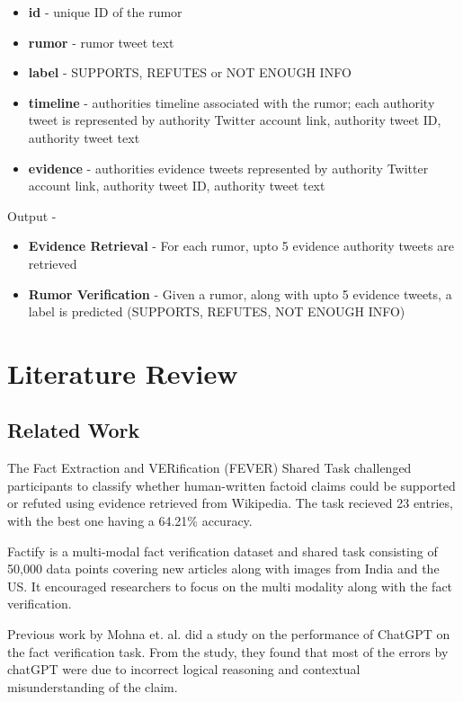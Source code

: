 \documentclass[conference]{IEEEtran}
\begin{document}
\begin{itemize}
    \item \textbf{id} - unique ID of the rumor
    \item \textbf{rumor} - rumor tweet text
    \item \textbf{label} - SUPPORTS, REFUTES or NOT ENOUGH INFO
    \item \textbf{timeline} - authorities timeline associated with the rumor; each authority tweet is represented by authority Twitter account link, authority tweet ID, authority tweet text
    \item \textbf{evidence} - authorities evidence tweets represented by authority Twitter account link, authority tweet ID, authority tweet text  
\end{itemize}
Output -
\begin{itemize}
    \item \textbf{Evidence Retrieval} - For each rumor, upto 5 evidence authority tweets are retrieved
    \item \textbf{Rumor Verification} - Given a rumor, along with upto 5 evidence tweets, a label is predicted (SUPPORTS, REFUTES, NOT ENOUGH INFO) 
    
\end{itemize}

\section{Literature Review}
\subsection{Related Work}
The Fact Extraction and VERification \cite{fever} (FEVER) Shared Task challenged participants to classify whether human-written factoid claims could be supported or refuted using evidence retrieved from Wikipedia. The task recieved 23 entries, with the best one having a 64.21\% accuracy. 

Factify \cite{factify} is a multi-modal fact verification dataset and shared task consisting of 50,000 data points covering new articles along with images from India and the US. It encouraged researchers to focus on the multi modality along with the fact verification.

Previous work by Mohna et. al. \cite{chat-gpt-study} did a study on the performance of ChatGPT on the fact verification task. From the study, they found that most of the errors by chatGPT were due to incorrect logical reasoning and contextual misunderstanding of the claim.
\end{document}
